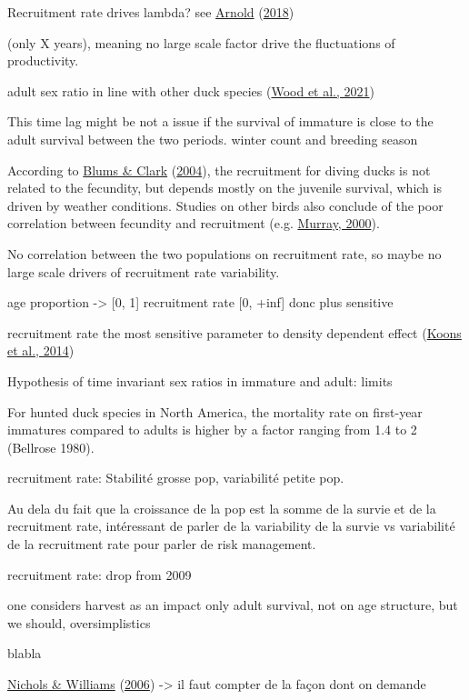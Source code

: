 \documentclass[
  english,
]{article}
\begin{document}
Recruitment rate drives lambda? see \protect\hyperlink{ref-Arnold2018}{Arnold} (\protect\hyperlink{ref-Arnold2018}{2018})

(only X years), meaning no large scale factor drive the fluctuations of productivity.

adult sex ratio in line with other duck species (\protect\hyperlink{ref-Wood2021}{Wood et al., 2021})

This time lag might be not a issue if the survival of immature is close to the adult survival between the two periods. winter count and breeding season

According to \protect\hyperlink{ref-Blums2004}{Blums \& Clark} (\protect\hyperlink{ref-Blums2004}{2004}), the recruitment for diving ducks is not related to the fecundity, but depends mostly on the juvenile survival, which is driven by weather conditions. Studies on other birds also conclude of the poor correlation between fecundity and recruitment (e.g. \protect\hyperlink{ref-Murray2000}{Murray, 2000}).

No correlation between the two populations on recruitment rate, so maybe no large scale drivers of recruitment rate variability.

age proportion -\textgreater{} {[}0, 1{]}
recruitment rate {[}0, +inf{]} donc plus sensitive

recruitment rate the most sensitive parameter to density dependent effect (\protect\hyperlink{ref-Koons2014}{Koons et al., 2014})

Hypothesis of time invariant sex ratios in immature and adult: limits

For hunted duck species in North America, the mortality rate on first-year immatures compared to adults is higher by a factor ranging from 1.4 to 2 (Bellrose 1980).

recruitment rate:
Stabilité grosse pop,
variabilité petite pop.

Au dela du fait que la croissance de la pop est la somme de la survie et de la recruitment rate,
intéressant de parler de la variability de la survie vs variabilité de la recruitment rate
pour parler de risk management.

recruitment rate: drop from 2009

one considers harvest as an impact only adult survival, not on age structure, but we should, oversimplistics

blabla

\protect\hyperlink{ref-Nichols2006}{Nichols \& Williams} (\protect\hyperlink{ref-Nichols2006}{2006}) -\textgreater{} il faut compter de la façon dont on demande
\end{document}
